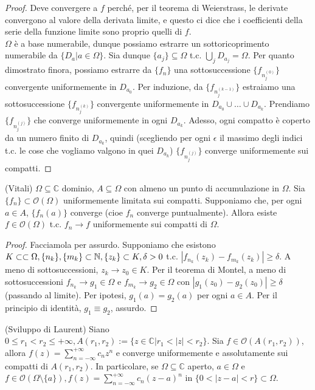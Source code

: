 \begin{proof}
  Deve convergere a $f$ perché, per il teorema di Weierstrass, le derivate convergono al valore della derivata limite, e questo ci dice che i coefficienti della serie della funzione limite sono proprio quelli di $f$. \\
  $\Omega$ è a base numerabile, dunque possiamo estrarre un sottoricoprimento numerabile da $\{D_a | a \in \Omega\}$. Sia dunque $\{a_j\} \subseteq \Omega$ t.c. $\displaystyle \bigcup_j D_{a_j}=\Omega$. Per quanto dimostrato finora, possiamo estrarre da $\{f_n\}$ una sottosuccessione $\{f_{n_j^{(0)}}\}$ convergente uniformemente in $D_{a_0}$.
  Per induzione, da $\{f_{n_j^{(k-1)}}\}$ estraiamo una sottosuccessione $\{f_{n_j^{(k)}}\}$ convergente uniformemente in $D_{a_0} \cup \dots \cup D_{a_k}$. Prendiamo $\{f_{n_j^{(j)}}\}$ che converge uniformemente in ogni $D_{a_k}$.
  Adesso, ogni compatto è coperto da un numero finito di $D_{a_k}$, quindi (scegliendo per ogni $\epsilon$ il massimo degli indici t.c. le cose che vogliamo valgono in quei $D_{a_k}$) $\{f_{n_j^{(j)}}\}$ converge uniformemente sui compatti.
\end{proof}

\begin{thm}
  (Vitali) $\Omega \subseteq \mathbb{C}$ dominio, $A \subseteq \Omega$ con almeno un punto di accumulazione in $\Omega$. Sia $\{f_n\} \subset \mathcal{O}(\Omega)$ uniformemente limitata sui compatti. Supponiamo che, per ogni $a \in A$, $\{f_n(a)\}$ converge (cioe $f_n$ converge puntualmente). Allora esiste $f \in \mathcal{O}(\Omega)$ t.c. $f_n \rightarrow f$ uniformemente sui compatti di $\Omega$.
\end{thm}

\begin{proof}
  Facciamola per assurdo. Supponiamo che esistono $K \subset\subset \Omega, \\ \{n_k\}, \{m_k\} \subset \mathbb{N}, \{z_k\} \subset K, \delta>0$ t.c. $|f_{n_k}(z_k)-f_{m_k}(z_k)| \ge \delta$. A meno di sottosuccessioni, $z_k \rightarrow z_0 \in K$.
  Per il teorema di Montel, a meno di sottosuccessioni $f_{n_k} \rightarrow g_1 \in \Omega$ e $f_{m_k} \rightarrow g_2 \in \Omega$ con $|g_1(z_0)-g_2(z_0)| \ge \delta$ (passando al limite). Per ipotesi,  $g_1(a)=g_2(a)$ per ogni $a \in A$. Per il principio di identità, $g_1 \equiv g_2$, assurdo.
\end{proof}

\begin{thm}
  (Sviluppo di Laurent) Siano $0 \le r_1 < r_2 \le +\infty, A(r_1, r_2):=\{z \in \mathbb{C} | r_1 < |z| < r_2 \}$. Sia $f \in \mathcal{O}(A(r_1, r_2))$, allora $\displaystyle f(z)=\sum_{n=-\infty}^{+\infty} c_nz^n$ e converge uniformemente e assolutamente sui compatti di $A(r_1, r_2)$.
  In particolare, se $\Omega \subseteq \mathbb{C}$ aperto, $a \in \Omega$ e $\displaystyle f \in \mathcal{O}(\Omega \setminus \{a\}), f(z)=\sum_{n=-\infty}^{+\infty} c_n(z-a)^n$ in $\{0<|z-a|<r\} \subset \Omega$.
\end{thm}

